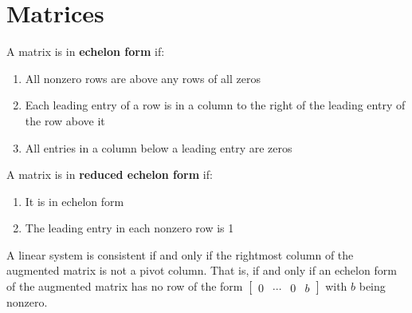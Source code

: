 \documentclass{article}
\begin{document}
\section*{Matrices}

A matrix is in \textbf{echelon form} if:
\begin{enumerate}
    \item All nonzero rows are above any rows of all zeros
    \item Each leading entry of a row is in a column to the right of the leading entry of the row
    above it
    \item All entries in a column below a leading entry are zeros
\end{enumerate}

\noindent
A matrix is in \textbf{reduced echelon form} if:
\begin{enumerate}
    \item It is in echelon form
    \item The leading entry in each nonzero row is 1
\end{enumerate}

\noindent
A linear system is consistent if and only if the rightmost column of the augmented matrix is not a
pivot column. That is, if and only if an echelon form of the augmented matrix has no row of the
form $\begin{bmatrix} 0 & \cdots & 0 & b \end{bmatrix}$ with $b$ being nonzero.
\end{document}
